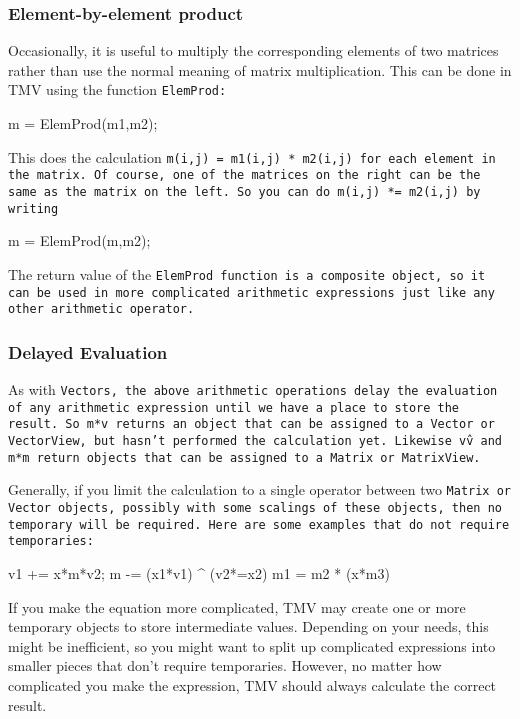 \subsubsection{Element-by-element product}
\label{MatrixElementProd}

Occasionally, it is useful to multiply the corresponding elements of two matrices rather than use the normal meaning of matrix multiplication.  This can be done in TMV using the function \tt{ElemProd}:
\begin{tmvcode}
m = ElemProd(m1,m2);
\end{tmvcode}
This does the calculation \tt{m(i,j) = m1(i,j) * m2(i,j)} for each element in the matrix.
Of course, one of the matrices on the right can be the same as the matrix on the left.  So you can do \tt{m(i,j) *= m2(i,j)} by writing
\begin{tmvcode}
m = ElemProd(m,m2);
\end{tmvcode}
The return value of the \tt{ElemProd} function is a composite object, so it can be used in more complicated arithmetic expressions just like any other arithmetic operator.

\subsubsection{Delayed Evaluation}

As with \tt{Vector}s, the above arithmetic operations delay the evaluation of any arithmetic
expression until we have a place to store the result.
So \tt{m*v} returns an object that can be assigned to a \tt{Vector} or 
\tt{VectorView},
but hasn't performed the calculation yet.  Likewise \tt{v\^v} and \tt{m*m} return objects that can be assigned to a \tt{Matrix} or \tt{MatrixView}.

Generally, if you limit the calculation to a single operator between
two \tt{Matrix} or \tt{Vector} objects, possibly with some scalings of these
objects, then no temporary will be required.  Here are some examples that
do not require temporaries:
\begin{tmvcode}
v1 += x*m*v2;
m -= (x1*v1) ^ (v2*=x2)
m1 = m2 * (x*m3)
\end{tmvcode}

If you make the 
equation more complicated, TMV may create one or more temporary objects
to store intermediate values.  Depending on your needs, this might be 
inefficient, so you might want to split up complicated expressions into 
smaller pieces that don't require temporaries.  However, no matter how
complicated you make the expression, TMV should always calculate the 
correct result.


